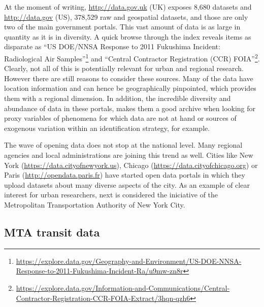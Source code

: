 \documentclass[12pt]{article}
\begin{document}
At the moment of writing, \url{http://data.gov.uk} (UK) exposes 8,680 datasets and
\url{http://data.gov} (US), 378,529 raw and geospatial datasets, and those are only two
of the main government portals. This vast amount of
data is as large in quantity as it is in diversity. A quick browse through the
index reveals items as disparate as ``US DOE/NNSA Response to 2011 Fukushima
Incident: Radiological Air
Samples''\footnote{\url{https://explore.data.gov/Geography-and-Environment/US-DOE-NNSA-Response-to-2011-Fukushima-Incident-Ra/u9mw-zn8r}}
and ``Central Contractor Registration (CCR)
FOIA''\footnote{\url{https://explore.data.gov/Information-and-Communications/Central-Contractor-Registration-CCR-FOIA-Extract/3hqn-qzh6}}.
Clearly, not all of this is potentially relevant for urban and regional
research. However there are still reasons to consider these
sources. Many of the data have location information and can hence be
geographically pinpointed, which provides them with a regional dimension.
In addition,
the incredible diversity and abundance of data in these portals, makes them a
good archive when looking for proxy variables of phenomena for which
data are not at hand or sources of exogenous
variation within an identification strategy, for example.

The wave of opening data does not stop at the national level.
Many regional agencies and local administrations are joining this trend as
well.
Cities like New York (\url{https://data.cityofnewyork.us}), Chicago
(\url{https://data.cityofchicago.org}) or Paris
(\url{http://opendata.paris.fr}) have started open data portals in which they
upload datasets about many diverse aspects of the city. As an example of clear
interest for urban researchers, next is considered the iniciative of the
Metropolitan Transportation Authority of New York City.

\subsection{MTA transit data}
\end{document}
